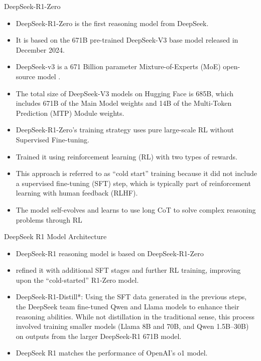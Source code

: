 \begin{frame}[fragile]{DeepSeek-R1-Zero}


    \begin{itemize}
        \item  DeepSeek-R1-Zero is the first reasoning model from DeepSeek.  
		\item It is based on the 671B pre-trained DeepSeek-V3 base model released in December 2024.
        \item  DeepSeek-v3 is a 671 Billion parameter Mixture-of-Experts (MoE) open-
source model . 
        \item  The total size of DeepSeek-V3 models on Hugging Face is 685B, which 
includes 671B of the Main Model weights and 14B of the Multi-Token 
Prediction (MTP) Module weights.		
		\item DeepSeek-R1-Zero's training strategy uses pure large-scale RL without 
Supervised Fine-tuning. 
		\item  Trained it using reinforcement learning (RL) with two types of rewards. 
		\item This approach is referred to as “cold start” training because it did not include a supervised fine-tuning (SFT) step, which is typically part of reinforcement learning with human feedback (RLHF).
        \item  The model self-evolves and learns to use long CoT to solve complex 
reasoning problems through RL
    \end{itemize}
\end{frame}

\begin{frame}[fragile]{DeepSeek R1 Model Architecture}


    \begin{itemize}
        \item  DeepSeek-R1 reasoning model is based on  DeepSeek-R1-Zero
		\item refined it with additional SFT stages and further RL training, improving upon the “cold-started” R1-Zero model.
		\item DeepSeek-R1-Distill*: Using the SFT data generated in the previous steps, the DeepSeek team fine-tuned Qwen and Llama models to enhance their reasoning abilities. While not distillation in the traditional sense, this process involved training smaller models (Llama 8B and 70B, and Qwen 1.5B–30B) on outputs from the larger DeepSeek-R1 671B model.
		\item DeepSeek R1 matches the performance of OpenAI's o1 model. 
    \end{itemize}
\end{frame}




